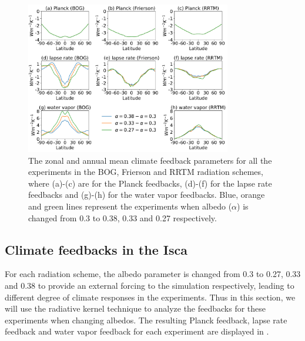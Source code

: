 \begin{figure}[ht]
	\centering
	\includegraphics[width=0.8\textwidth]{figs/polar_amp/all_zonalmean_feedbacks}
	\caption[The zonal and annual mean climate feedback parameters for all the experiments in the BOG, Frierson and RRTM radiation schemes]{The zonal and annual mean climate feedback parameters for all the experiments in the BOG, Frierson and RRTM radiation schemes, where (a)-(c) are for the Planck feedbacks, (d)-(f) for the lapse rate feedbacks and (g)-(h) for the water vapor feedbacks. Blue, orange and green lines represent the experiments when albedo ($\alpha$) is changed from 0.3 to 0.38, 0.33 and 0.27 respectively.}
	\label{fig:all_feedbacks}
\end{figure}


\subsection{Climate feedbacks in the Isca}
For each radiation scheme, the albedo parameter is changed from 0.3 to 0.27, 0.33 and 0.38 to provide an external forcing to the simulation respectively, leading to different degree of climate responses in the experiments. Thus in this section, we will use the radiative kernel technique to analyze the feedbacks for these experiments when changing albedos. The resulting Planck feedback, lapse rate feedback and water vapor feedback for each experiment are displayed in .


